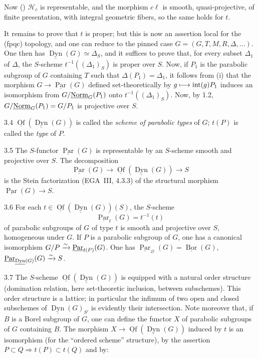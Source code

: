 Now (\loccit) $\mathscr H_c$ is representable, and the morphism $c\ell$ is smooth, quasi-projective, of finite presentation, with integral geometric fibers, so the same holds for $t$.

It remains to prove that $t$ is proper; but this is now an assertion local for the (fpqc) topology, and one can reduce to the pinned case $G=(G,T,M,R,\Delta,\ldots)$. One then has $\underline{\operatorname{Dyn}}(G)\simeq\Delta_S$, and it suffices to prove that, for every subset $\Delta_1$ of $\Delta$, the $S$-scheme $t^{-1}((\Delta_1)_S)$ is proper over $S$. Now, if $P_1$ is the parabolic subgroup of $G$ containing $T$ such that $\Delta(P_1)=\Delta_1$, it follows from (i) that the morphism $G\to\underline{\operatorname{Par}}(G)$ defined set-theoretically by $g\longmapsto\operatorname{int}(g)P_1$ induces an isomorphism from $G/\underline{\mathrm{Norm}}_G(P_1)$ onto $t^{-1}((\Delta_1)_S)$. Now, by 1.2, $G/\underline{\mathrm{Norm}}_G(P_1)=G/P_1$ is projective over $S$.
\begin{definition}{3.4}\label{XXVI.3.4}
$\underline{\operatorname{Of}}(\underline{\operatorname{Dyn}}(G))$ is called the \emph{scheme of parabolic types} of $G$; $t(P)$ is called the \emph{type} of $P$.
\end{definition}
\begin{corollary}{3.5}\label{XXVI.3.5}
The $S$-functor $\underline{\operatorname{Par}}(G)$ is representable by an $S$-scheme smooth and projective over $S$. The decomposition
\[
\underline{\operatorname{Par}}(G)\to\underline{\operatorname{Of}}(\underline{\operatorname{Dyn}}(G))\to S
\]
is the Stein factorization (EGA~III, 4.3.3) of the structural morphism $\underline{\operatorname{Par}}(G)\to S$.
\end{corollary}
\begin{corollary}{3.6}\label{XXVI.3.6}
For each $t\in\underline{\operatorname{Of}}(\underline{\operatorname{Dyn}}(G))(S)$, the $S$-scheme
\[
\underline{\operatorname{Par}}_t(G)=t^{-1}(t)
\]
of parabolic subgroups of $G$ of type $t$ is smooth and projective over $S$, homogeneous under $G$. If $P$ is a parabolic subgroup of $G$, one has a canonical isomorphism $G/P\xrightarrow{\sim}\underline{\operatorname{Par}}_{t(P)}(G)$. One has $\underline{\operatorname{Par}}_\varnothing(G)=\underline{\operatorname{Bor}}(G)$, $\underline{\operatorname{Par}}_{\underline{\operatorname{Dyn}}(G)}(G)\xrightarrow{\sim} S$.
\end{corollary}
\begin{remark}{3.7}\label{XXVI.3.7}
The $S$-scheme $\underline{\operatorname{Of}}(\underline{\operatorname{Dyn}}(G))$ is equipped with a natural order structure (domination relation, here set-theoretic inclusion, between subschemes). This order structure is a lattice; in particular the infimum of two open and closed subschemes of $\underline{\operatorname{Dyn}}(G)_{S'}$ is evidently their intersection. Note moreover that, if $B$ is a Borel subgroup of $G$, one can define the functor $X$ of parabolic subgroups of $G$ containing $B$. The morphism $X\to\underline{\operatorname{Of}}(\underline{\operatorname{Dyn}}(G))$ induced by $t$ is an isomorphism (for the ``ordered scheme'' structure), by the assertion $P\subset Q\Rightarrow t(P)\subset t(Q)$ and by:
\end{remark}
